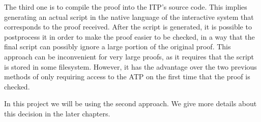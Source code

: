 The third one is to compile the proof into the ITP's source code. This implies generating
an actual script in the native language of the interactive system
that corresponds to the proof received. After the script is generated, it is
possible to postprocess
it in order to make the proof easier to be checked,
in a way that the final script can possibly ignore a large portion of the
original proof. This approach can be inconvenient for very large proofs,
as it requires that the script is stored in some filesystem. However,
it has the advantage over the two previous methods of only requiring access to the ATP
on the first time that the proof is checked.

In this project we will be using the second approach. We give more details about this
decision in the later chapters.

